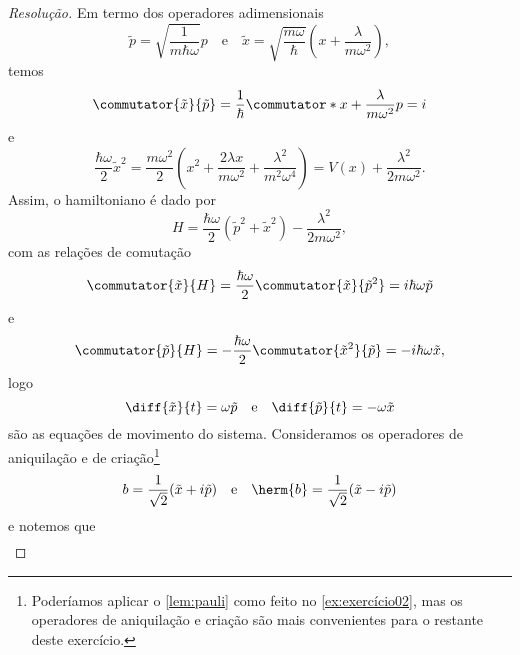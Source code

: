 \begin{proof}[Resolução]
    Em termo dos operadores adimensionais
    \begin{equation*}
        \tilde{p} = \sqrt{\frac{1}{m \hbar \omega}} p
        \quad\text{e}\quad
        \tilde{x} = \sqrt{\frac{m \omega}{\hbar}} \left(x + \frac{\lambda}{m \omega^2}\right),
    \end{equation*}
    temos
    \begin{equation*}
        \commutator{\tilde{x}}{\tilde{p}} = \frac{1}{\hbar} \commutator*{x + \frac{\lambda}{m \omega^2}}{p} = i
    \end{equation*}
    e
    \begin{equation*}
        \frac{\hbar \omega}{2}\tilde{x}^2 = \frac{m \omega^2}{2} \left(x^2 + \frac{2\lambda x}{m \omega^2}+ \frac{\lambda^2}{m^2 \omega^4}\right) = V(x) + \frac{\lambda^2}{2 m \omega^2}.
    \end{equation*}
    Assim, o hamiltoniano é dado por
    \begin{equation*}
        H = \frac{\hbar \omega}{2} \left(\tilde{p}^2 + \tilde{x}^2\right) - \frac{\lambda^2}{2m \omega^2},
    \end{equation*}
    com as relações de comutação
    \begin{equation*}
        \commutator{\tilde{x}}{H} = \frac{\hbar \omega}{2} \commutator{\tilde{x}}{\tilde{p}^2} = i \hbar \omega \tilde{p}
    \end{equation*}
    e
    \begin{equation*}
        \commutator{\tilde{p}}{H} = -\frac{\hbar \omega}{2} \commutator{\tilde{x}^2}{\tilde{p}} = - i\hbar \omega \tilde{x},
    \end{equation*}
    logo
    \begin{equation*}
        \diff{\tilde{x}}{t} = \omega \tilde{p}\quad\text{e}\quad\diff{\tilde{p}}{t} = - \omega \tilde{x}
    \end{equation*}
    são as equações de movimento do sistema. Consideramos os operadores de aniquilação e de criação\footnote{Poderíamos aplicar o \cref{lem:pauli} como feito no \cref{ex:exercício02}, mas os operadores de aniquilação e criação são mais convenientes para o restante deste exercício.}
    \begin{equation*}
        b = \frac{1}{\sqrt{2}}(\tilde{x} + i \tilde{p})
        \quad\text{e}\quad
        \herm{b} = \frac{1}{\sqrt{2}}(\tilde{x} - i \tilde{p})
    \end{equation*}
    e notemos que
    \begin{align*}

\end{align*}
\end{proof}
